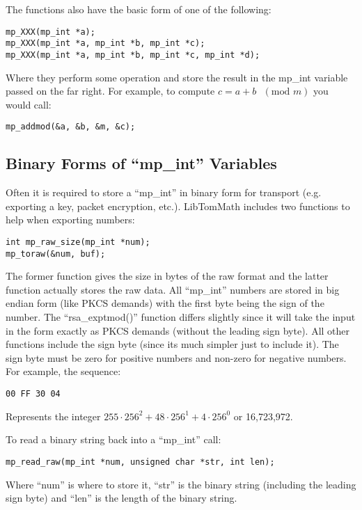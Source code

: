 \documentclass[b5paper]{book}
\begin{document}
The functions also have the basic form of one of the following:
\begin{verbatim}
mp_XXX(mp_int *a);
mp_XXX(mp_int *a, mp_int *b, mp_int *c);
mp_XXX(mp_int *a, mp_int *b, mp_int *c, mp_int *d);
\end{verbatim}

Where they perform some operation and store the result in the mp\_int variable passed on the far right.  
For example, to compute $c = a + b \mbox{ }(\mbox{mod }m)$ you would call:
\begin{verbatim}
mp_addmod(&a, &b, &m, &c);
\end{verbatim}

\subsection{Binary Forms of ``mp\_int'' Variables}

Often it is required to store a ``mp\_int'' in binary form for transport (e.g. exporting a key, packet 
encryption, etc.).  LibTomMath includes two functions to help when exporting numbers:
\begin{verbatim}
int mp_raw_size(mp_int *num);
mp_toraw(&num, buf);
\end{verbatim}

The former function gives the size in bytes of the raw format and the latter function actually stores the raw data.  All
``mp\_int'' numbers are stored in big endian form (like PKCS demands) with the first byte being the sign of the number.  The
``rsa\_exptmod()'' function differs slightly since it will take the input in the form exactly as PKCS demands (without the
leading sign byte).  All other functions include the sign byte (since its much simpler just to include it).  The sign byte
must be zero for positive numbers and non-zero for negative numbers.  For example,
the sequence:
\begin{verbatim}
00 FF 30 04
\end{verbatim}
Represents the integer $255 \cdot 256^2 + 48 \cdot 256^1 + 4 \cdot 256^0$ or 16,723,972.

To read a binary string back into a ``mp\_int'' call:
\begin{verbatim}
mp_read_raw(mp_int *num, unsigned char *str, int len);
\end{verbatim}
Where ``num'' is where to store it, ``str'' is the binary string (including the leading sign byte) and ``len'' is the 
length of the binary string.
\end{document}
